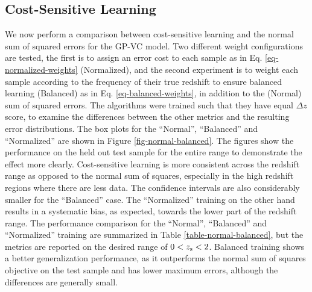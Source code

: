\documentclass[useAMS,usenatbib,fleqn]{mn2e}
\begin{document}
\subsection{Cost-Sensitive Learning}

We now perform a comparison between cost-sensitive learning and the normal sum of squared errors for the GP-VC model. Two different weight configurations are tested, the first is to assign an error cost to each sample as in Eq. \eqref{eq-normalized-weights} (Normalized), and the second experiment is to weight each sample according to the frequency of their true redshift to ensure balanced learning (Balanced) as in Eq. \eqref{eq-balanced-weights}, in addition to the (Normal) sum of squared errors. The algorithms were trained such that they have equal $\Delta z$ score, to examine the differences between the other metrics and the resulting error distributions. The box plots for the ``Normal'', ``Balanced'' and ``Normalized'' are shown in Figure \ref{fig-normal-balanced}. The figures show the performance on the held out test sample for the entire range to demonstrate the effect more clearly. Cost-sensitive learning is more consistent across the redshift range as opposed to the normal sum of squares, especially in the high redshift regions where there are less data. The confidence intervals are also considerably smaller for the ``Balanced'' case. The ``Normalized'' training on the other hand results in a systematic bias, as expected, towards the lower part of the redshift range. The performance comparison for the ``Normal'', ``Balanced'' and ``Normalized'' training are summarized in Table \ref{table-normal-balanced}, but the metrics are reported on the desired range of $0<z_{\rm s}<2$. Balanced training shows a better generalization performance, as it outperforms the normal sum of squares objective on the test sample and has lower maximum errors, although the differences are generally small.
\end{document}

